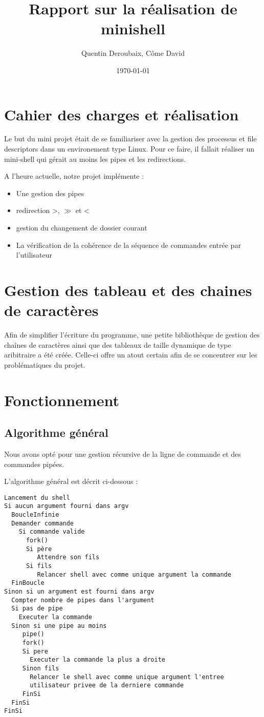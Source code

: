 \documentclass[fr]{article}
\begin{document}
\date{\today}

\title{Rapport sur la réalisation de minishell}
\author{Quentin Deroubaix, Côme David}
\maketitle

\section{Cahier des charges et réalisation}
Le but du mini projet était de se familiariser avec la gestion des
processus et file descriptors dans un environement type Linux. Pour ce
faire, il fallait réaliser un mini-shell qui gérait au moins les pipes
et les redirections.


A l'heure actuelle, notre projet implémente :

\begin{itemize}
\item Une gestion des pipes  
\item redirection >, $\gg$ et <
\item gestion du changement de dossier courant
\item La vérification de la cohérence de la séquence de commandes
  entrée par l'utilisateur
\end{itemize}

\section{Gestion des tableau et des chaines de caractères}
Afin de simplifier l'écriture du programme, une petite bibliothèque de
gestion des chaînes de caractères ainsi que des tableaux
de taille dynamique de type aribitraire a été créée. 
Celle-ci offre un atout certain afin de se concentrer sur les
problématiques du projet.


\section{Fonctionnement}
\subsection{Algorithme général}
Nous avons opté pour une gestion récursive de la ligne de commande et
des commandes pipées. 

L'algorithme général est décrit ci-dessous : 
\begin{lstlisting}
Lancement du shell 
Si aucun argument fourni dans argv
  BoucleInfinie
  Demander commande
    Si commande valide
      fork() 
      Si père 
         Attendre son fils
      Si fils 
         Relancer shell avec comme unique argument la commande
  FinBoucle
Sinon si un argument est fourni dans argv
  Compter nombre de pipes dans l'argument
  Si pas de pipe
    Executer la commande
  Sinon si une pipe au moins
     pipe()
     fork()
     Si pere
       Executer la commande la plus a droite
     Sinon fils
       Relancer le shell avec comme unique argument l'entree
       utilisateur privee de la derniere commande
     FinSi
  FinSi
FinSi
\end{lstlisting}
\end{document}

